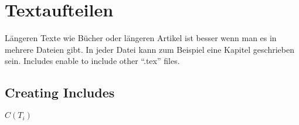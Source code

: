 \chapter{Textaufteilen}
Längeren Texte wie Bücher oder längeren Artikel ist besser wenn man es in mehrere Dateien gibt. In jeder Datei kann zum Beispiel eine Kapitel geschrieben sein.
Includes enable to include other "`.tex"' files.
\section{Creating Includes}
\normalsize$C(T_i)$
